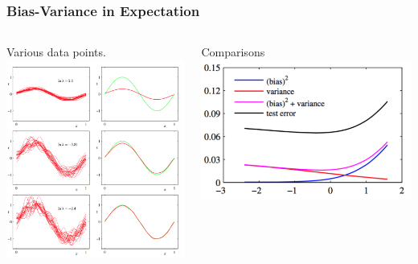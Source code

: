\documentclass{beamer}
\begin{document}
\begin{frame}
\frametitle{Bias-Variance in Expectation }

 \begin{columns}[T]
\begin{column}{.47\textwidth}
\begin{block}{Various data points.}
\includegraphics[width=\textwidth]{Figure6}

\end{block}
\end{column}


\begin{column}{.47\textwidth}
\begin{block}{Comparisons}
\includegraphics[width=\textwidth]{Figure7}


\end{block}
\end{column}
\end{columns}
\end{frame}
\end{document}
